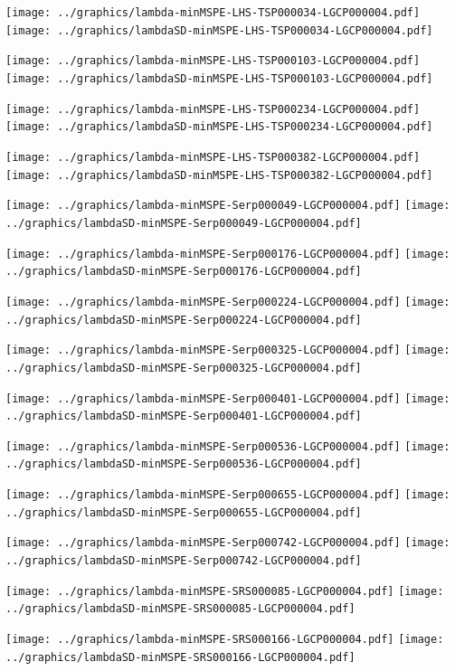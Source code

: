 \documentclass[review]{elsarticle}
\begin{document}
\texttt{[image: ../graphics/lambda-minMSPE-LHS-TSP000034-LGCP000004.pdf]}
\texttt{[image: ../graphics/lambdaSD-minMSPE-LHS-TSP000034-LGCP000004.pdf]}

\texttt{[image: ../graphics/lambda-minMSPE-LHS-TSP000103-LGCP000004.pdf]}
\texttt{[image: ../graphics/lambdaSD-minMSPE-LHS-TSP000103-LGCP000004.pdf]}

\texttt{[image: ../graphics/lambda-minMSPE-LHS-TSP000234-LGCP000004.pdf]}
\texttt{[image: ../graphics/lambdaSD-minMSPE-LHS-TSP000234-LGCP000004.pdf]}

\texttt{[image: ../graphics/lambda-minMSPE-LHS-TSP000382-LGCP000004.pdf]}
\texttt{[image: ../graphics/lambdaSD-minMSPE-LHS-TSP000382-LGCP000004.pdf]}

\texttt{[image: ../graphics/lambda-minMSPE-Serp000049-LGCP000004.pdf]}
\texttt{[image: ../graphics/lambdaSD-minMSPE-Serp000049-LGCP000004.pdf]}

\texttt{[image: ../graphics/lambda-minMSPE-Serp000176-LGCP000004.pdf]}
\texttt{[image: ../graphics/lambdaSD-minMSPE-Serp000176-LGCP000004.pdf]}

\texttt{[image: ../graphics/lambda-minMSPE-Serp000224-LGCP000004.pdf]}
\texttt{[image: ../graphics/lambdaSD-minMSPE-Serp000224-LGCP000004.pdf]}

\texttt{[image: ../graphics/lambda-minMSPE-Serp000325-LGCP000004.pdf]}
\texttt{[image: ../graphics/lambdaSD-minMSPE-Serp000325-LGCP000004.pdf]}

\texttt{[image: ../graphics/lambda-minMSPE-Serp000401-LGCP000004.pdf]}
\texttt{[image: ../graphics/lambdaSD-minMSPE-Serp000401-LGCP000004.pdf]}

\texttt{[image: ../graphics/lambda-minMSPE-Serp000536-LGCP000004.pdf]}
\texttt{[image: ../graphics/lambdaSD-minMSPE-Serp000536-LGCP000004.pdf]}

\texttt{[image: ../graphics/lambda-minMSPE-Serp000655-LGCP000004.pdf]}
\texttt{[image: ../graphics/lambdaSD-minMSPE-Serp000655-LGCP000004.pdf]}

\texttt{[image: ../graphics/lambda-minMSPE-Serp000742-LGCP000004.pdf]}
\texttt{[image: ../graphics/lambdaSD-minMSPE-Serp000742-LGCP000004.pdf]}

\texttt{[image: ../graphics/lambda-minMSPE-SRS000085-LGCP000004.pdf]}
\texttt{[image: ../graphics/lambdaSD-minMSPE-SRS000085-LGCP000004.pdf]}

\texttt{[image: ../graphics/lambda-minMSPE-SRS000166-LGCP000004.pdf]}
\texttt{[image: ../graphics/lambdaSD-minMSPE-SRS000166-LGCP000004.pdf]}
\end{document}
